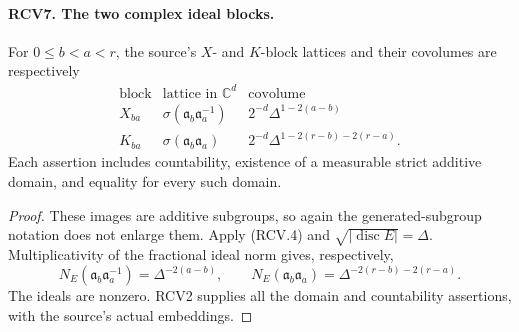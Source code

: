 \documentclass[11pt,a4paper]{article}
\numberwithin{equation}{section}
\theoremstyle{remark}\newtheorem{remark}[theorem]{Remark}
\begin{document}
\paragraph{RCV7. The two complex ideal blocks.}
\label{claim:RCV7}
For \(0\leq b<a<r\), the source's \(X\)- and \(K\)-block
lattices and their covolumes are respectively
\[
\begin{array}{c|c|c}
 \text{block}&\text{lattice in }\mathbb C^d&\text{covolume}\\ \hline
 X_{ba}&\sigma(\mathfrak a_b\mathfrak a_a^{-1})
                 &2^{-d}\Delta^{1-2(a-b)}\\
 K_{ba}&\sigma(\mathfrak a_b\mathfrak a_a)
                 &2^{-d}\Delta^{1-2(r-b)-2(r-a)}.
\end{array}
\tag{RCV.11}
\]
Each assertion includes countability, existence of a measurable
strict additive domain, and equality for every such domain.
\begin{proof}
These images are additive subgroups, so again the generated-subgroup
notation does not enlarge them.  Apply (RCV.4) and
\(\sqrt{|\operatorname{disc}E|}=\Delta\).  Multiplicativity of
the fractional ideal norm gives, respectively,
\[
 N_E(\mathfrak a_b\mathfrak a_a^{-1})=\Delta^{-2(a-b)},
 \qquad
 N_E(\mathfrak a_b\mathfrak a_a)
       =\Delta^{-2(r-b)-2(r-a)}.
\]
The ideals are nonzero.  RCV2 supplies all the domain and
countability assertions, with the source's actual embeddings.
\end{proof}

\end{document}
